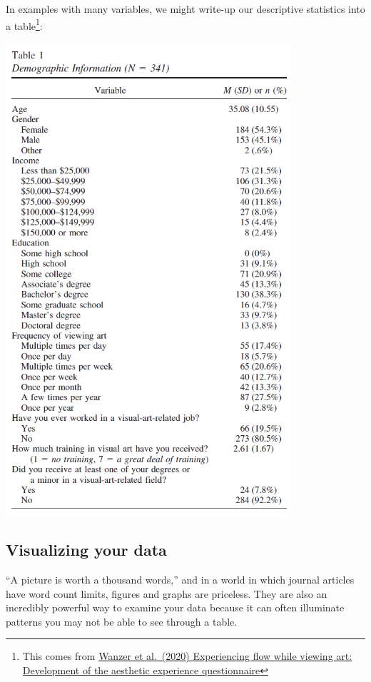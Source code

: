 \documentclass[
]{book}
\begin{document}
In examples with many variables, we might write-up our descriptive statistics into a table\footnote{This comes from \href{https://psycnet.apa.org/record/2018-49650-001}{Wanzer et al.~(2020) Experiencing flow while viewing art: Development of the aesthetic experience questionnaire}}:

\includegraphics[width=4.16667in,height=\textheight]{images/02-stats-foundations/example2.png}

\hypertarget{visualizing-your-data}{%
\subsection{Visualizing your data}\label{visualizing-your-data}}

``A picture is worth a thousand words,'' and in a world in which journal articles have word count limits, figures and graphs are priceless. They are also an incredibly powerful way to examine your data because it can often illuminate patterns you may not be able to see through a table.
\end{document}
